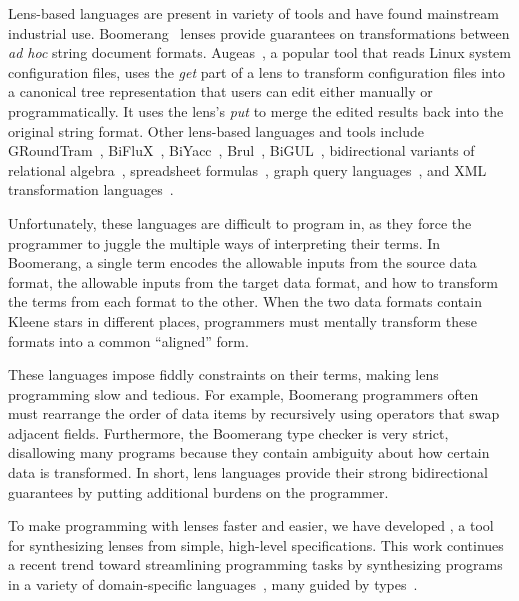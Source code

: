 \documentclass[acmsmall,screen]{acmart}
\begin{document}
Lens-based languages are present in variety of tools and have found mainstream
industrial use.
Boomerang~\cite{boomerang, Matching10} lenses provide
guarantees on transformations between {\em ad hoc} string document formats.
Augeas~\cite{augeas}, a popular tool that reads Linux system configuration
files, uses the \emph{get} part of a lens to transform configuration
files into a canonical tree representation that users can edit
either manually or 
programmatically.  It uses the lens's \emph{put} to merge the edited
results back into the original string format.  Other lens-based languages and
tools include 
%
GRoundTram~\cite{Hidaka2011GRoundTramAI},
%
BiFluX~\cite{DBLP:conf/ppdp/PachecoZH14}, 
%
BiYacc~\cite{DBLP:conf/staf/ZhuK0SH15},
%
Brul~\cite{DBLP:conf/etaps/ZanLKH16},
%
BiGUL~\cite{DBLP:conf/pepm/KoZH16}, 
%
bidirectional variants of 
relational algebra~\cite{BohannonPierceVaughan},
spreadsheet formulas~\cite{DBLP:conf/vl/MacedoPSC14},
graph query languages~\cite{DBLP:conf/icfp/HidakaHIKMN10},
and
XML transformation languages~\cite{DBLP:conf/pepm/LiuHT07}.
%

%
Unfortunately, these languages are difficult to program in, as they force the
programmer to juggle the multiple ways of interpreting their terms.
In Boomerang, a single term encodes
the allowable inputs from the source data format, the allowable
inputs from the target data format, and how to transform the terms from each
format to the other.
When the two data formats contain Kleene stars in different places, programmers
must mentally transform these formats into a common ``aligned'' form.

These languages impose fiddly constraints on their terms, making lens programming
slow and tedious. For example, Boomerang programmers often must rearrange the
order of data items by recursively using operators that swap adjacent fields.
Furthermore, the Boomerang type checker is very strict, disallowing many
programs because they contain ambiguity about how certain data is transformed.
In short, lens languages provide their strong bidirectional guarantees by
putting additional burdens on the programmer.

To make programming with lenses faster and easier, we have
developed \emph{\Optician{}}, a
tool for synthesizing lenses from simple, high-level specifications.
This work continues a recent trend toward streamlining programming tasks
by synthesizing programs in a variety of domain-specific
languages~\cite{flashfill,le-pldi-2014,perelman2014test,morpheus},
many guided by
types~\cite{osera+:pldi15,frankle+:popl16,armando+:pldi16,feser-pldi-2015,morpheus}.
\end{document}
